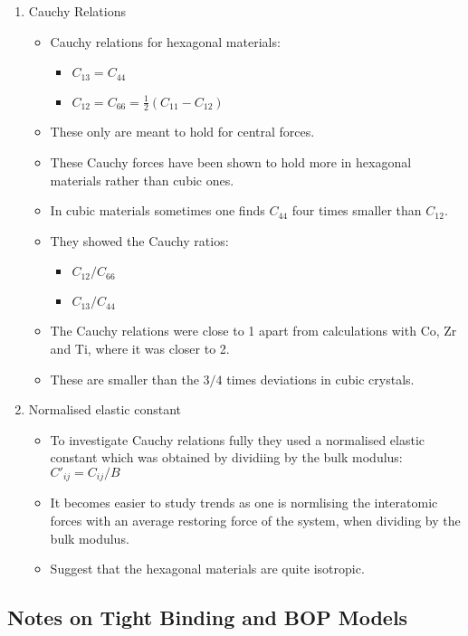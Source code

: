 \documentclass[11pt]{article}
\begin{document}
\begin{enumerate}
\item Cauchy Relations
\label{sec:org39bc28a}
\begin{itemize}
\item Cauchy relations for hexagonal materials:
\begin{itemize}
\item \(C_{13} = C_{44}\)
\item \(C_{12} = C_{66} = \frac{1}{2}(C_{11} - C_{12})\)
\end{itemize}
\item These only are meant to hold for central forces.
\item These Cauchy forces have been shown to hold more in hexagonal materials
rather than cubic ones.
\item In cubic materials sometimes one finds \(C_{44}\) four times smaller than
\(C_{12}\).
\item They showed the Cauchy ratios:
\begin{itemize}
\item \(C_{12}/C_{66}\)
\item \(C_{13}/C_{44}\)
\end{itemize}
\item The Cauchy relations were close to 1 apart from calculations with Co, Zr and
Ti, where it was closer to 2.
\item These are smaller than the \(3/4\) times deviations in cubic crystals.
\end{itemize}

\item Normalised elastic constant
\label{sec:org62fe3a6}
\begin{itemize}
\item To investigate Cauchy relations fully they used a normalised elastic constant which
was obtained by dividiing by the bulk modulus: \(C'_{ij} = C_{ij}/B\)
\item It becomes easier to study trends as one is normlising the
interatomic forces with an average restoring force of the system,
when dividing by the bulk modulus.
\item Suggest that the hexagonal materials are quite isotropic.
\end{itemize}
\end{enumerate}
\subsection{Notes on Tight Binding and BOP Models}
\label{sec:org111ade3}
\end{document}
